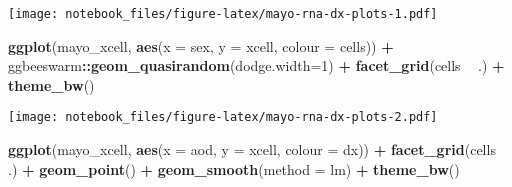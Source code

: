 \documentclass[]{book}
\newenvironment{Shaded}{\begin{snugshade}}{\end{snugshade}}
\newcommand{\DataTypeTok}[1]{\textcolor[rgb]{0.13,0.29,0.53}{#1}}
\newcommand{\DecValTok}[1]{\textcolor[rgb]{0.00,0.00,0.81}{#1}}
\newcommand{\KeywordTok}[1]{\textcolor[rgb]{0.13,0.29,0.53}{\textbf{#1}}}
\newcommand{\NormalTok}[1]{#1}
\newcommand{\OperatorTok}[1]{\textcolor[rgb]{0.81,0.36,0.00}{\textbf{#1}}}
\newcommand{\StringTok}[1]{\textcolor[rgb]{0.31,0.60,0.02}{#1}}
\begin{document}
\begin{Shaded}
\end{Shaded}

\texttt{[image: notebook\_files/figure-latex/mayo-rna-dx-plots-1.pdf]}

\begin{Shaded}
\begin{Highlighting}[]
\KeywordTok{ggplot}\NormalTok{(mayo_xcell, }\KeywordTok{aes}\NormalTok{(}\DataTypeTok{x =}\NormalTok{ sex, }\DataTypeTok{y =}\NormalTok{ xcell, }\DataTypeTok{colour =}\NormalTok{ cells)) }\OperatorTok{+}\StringTok{ }
\StringTok{  }\NormalTok{ggbeeswarm}\OperatorTok{::}\KeywordTok{geom_quasirandom}\NormalTok{(}\DataTypeTok{dodge.width=}\DecValTok{1}\NormalTok{) }\OperatorTok{+}\StringTok{ }
\StringTok{  }\KeywordTok{facet_grid}\NormalTok{(cells }\OperatorTok{~}\StringTok{ }\NormalTok{.) }\OperatorTok{+}\StringTok{ }
\StringTok{  }\KeywordTok{theme_bw}\NormalTok{()}
\end{Highlighting}
\end{Shaded}

\texttt{[image: notebook\_files/figure-latex/mayo-rna-dx-plots-2.pdf]}

\begin{Shaded}
\begin{Highlighting}[]
\KeywordTok{ggplot}\NormalTok{(mayo_xcell, }\KeywordTok{aes}\NormalTok{(}\DataTypeTok{x =}\NormalTok{ aod, }\DataTypeTok{y =}\NormalTok{ xcell, }\DataTypeTok{colour =}\NormalTok{ dx)) }\OperatorTok{+}\StringTok{ }
\StringTok{  }\KeywordTok{facet_grid}\NormalTok{(cells }\OperatorTok{~}\StringTok{ }\NormalTok{.) }\OperatorTok{+}
\StringTok{  }\KeywordTok{geom_point}\NormalTok{() }\OperatorTok{+}\StringTok{ }
\StringTok{  }\KeywordTok{geom_smooth}\NormalTok{(}\DataTypeTok{method =}\NormalTok{ lm) }\OperatorTok{+}\StringTok{ }
\StringTok{  }\KeywordTok{theme_bw}\NormalTok{()}
\end{Highlighting}
\end{Shaded}
\end{document}

